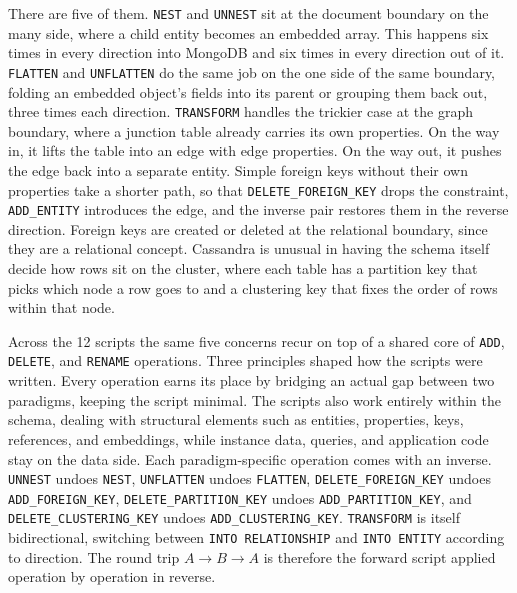 There are five of them. \texttt{NEST} and \texttt{UNNEST} sit at the document boundary on the many side, where a child entity becomes an embedded array. This happens six times in every direction into MongoDB and six times in every direction out of it. \texttt{FLATTEN} and \texttt{UNFLATTEN} do the same job on the one side of the same boundary, folding an embedded object's fields into its parent or grouping them back out, three times each direction. \texttt{TRANSFORM} handles the trickier case at the graph boundary, where a junction table already carries its own properties. On the way in, it lifts the table into an edge with edge properties. On the way out, it pushes the edge back into a separate entity. Simple foreign keys without their own properties take a shorter path, so that \texttt{DELETE\_FOREIGN\_KEY} drops the constraint, \texttt{ADD\_ENTITY} introduces the edge, and the inverse pair restores them in the reverse direction. Foreign keys are created or deleted at the relational boundary, since they are a relational concept. Cassandra is
  unusual in having the schema itself decide how rows sit on the cluster, where each table has a partition key that picks which node a row goes to and a clustering key
  that fixes the order of rows within that node.


Across the 12 scripts the same five concerns recur on top of a shared core of \texttt{ADD}, \texttt{DELETE}, and \texttt{RENAME} operations. Three principles shaped
  how the scripts were written. Every operation earns its place by bridging an actual gap between two paradigms, keeping the script minimal. The scripts also work
  entirely within the schema, dealing with structural elements such as entities, properties, keys, references, and embeddings, while instance data, queries, and
  application code stay on the data side. Each paradigm-specific operation comes with an inverse. \texttt{UNNEST} undoes \texttt{NEST}, \texttt{UNFLATTEN} undoes          \texttt{FLATTEN}, \texttt{DELETE\_FOREIGN\_KEY} undoes \texttt{ADD\_FOREIGN\_KEY}, \texttt{DELETE\_PARTITION\_KEY} undoes \texttt{ADD\_PARTITION\_KEY}, and
  \texttt{DELETE\_CLUSTERING\_KEY} undoes \texttt{ADD\_CLUSTERING\_KEY}. \texttt{TRANSFORM} is itself bidirectional, switching between \texttt{INTO RELATIONSHIP} and
  \texttt{INTO ENTITY} according to direction. The round trip $A \to B \to A$ is therefore the forward script applied operation by operation in reverse.


